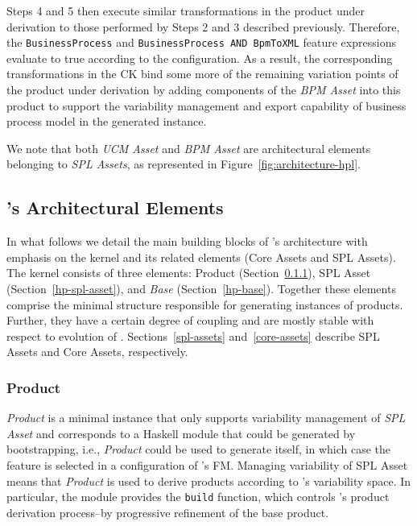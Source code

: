 Steps 4 and 5 then execute similar transformations in the product under derivation to those performed by Steps 2 and 3 described previously.  Therefore, the \texttt{BusinessProcess} and \texttt{BusinessProcess AND BpmToXML} feature expressions evaluate to true according to the configuration. As a result, the corresponding transformations in the CK bind some more of the remaining variation points of the product under derivation by adding components of the \textit{BPM Asset} into this product to support the variability management and export capability of business process model in the generated \hpl{} instance.

We note that both \textit{UCM Asset} and \textit{BPM Asset} are architectural elements belonging to \textit{SPL Assets}, as represented in Figure~\ref{fig:architecture-hpl}.


\subsection{\hpl's Architectural Elements} \label{architectural-elements-hpl}

In what follows we detail the main building blocks of \hpl{}'s architecture with emphasis on the kernel and its related elements (Core Assets and SPL Assets).  The kernel consists of three elements: \hp{} Product (Section~\ref{hp-product}), \hp{} SPL Asset (Section~\ref{hp-spl-asset}), and \hp{} \emph{Base} (Section~\ref{hp-base}). Together these elements comprise the minimal structure responsible for generating instances of \hpl{} products. Further, they have a certain degree of coupling and are mostly stable with respect to evolution of \hpl{}. Sections~\ref{spl-assets} and~\ref{core-assets} describe SPL Assets and Core Assets, respectively.


\subsubsection{\hp{} Product} 
\label{hp-product}

\hp{} \emph{Product} is a minimal \hpl{} instance that only supports variability management of \hp{} \emph{SPL Asset} and corresponds to a Haskell module that could be generated by bootstrapping, i.e., \hp{} \emph{Product} could be used to generate itself, in which case the \hp{} feature is selected in a configuration of \hpl's FM. Managing variability of \hp{} SPL Asset means that \hp{} \emph{Product} is used to derive products according to \hpl{}'s variability space. In particular, the module provides the \texttt{build} function, which controls \hpl{}'s product derivation process--by progressive refinement of the base product.

